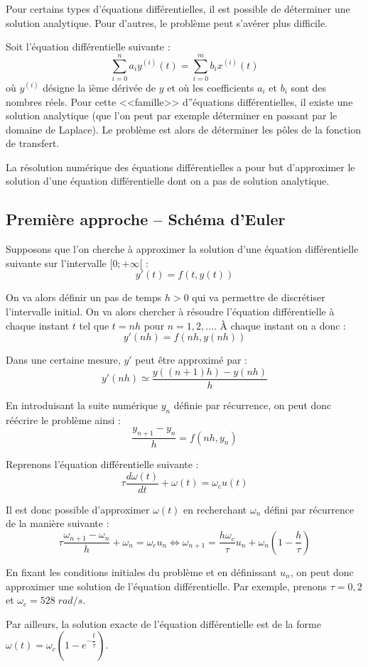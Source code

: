 \documentclass[10pt,fleqn]{article} %
\begin{document}
Pour certains types d'équations différentielles, il est possible de déterminer une solution analytique. Pour d'autres, le problème peut s'avérer plus difficile. 
\begin{exemple}
Soit l'équation différentielle suivante :
$$
\sum\limits_{i=0}^n a_i y^{(i)}(t) = \sum\limits_{i=0}^m b_i x^{(i)}(t)
$$
où $y^{(i)}$ désigne la ième dérivée de $y$ et où les coefficients $a_i$ et $b_i$ sont des nombres réels. Pour cette <<famille>> d''équations différentielles, il existe une solution analytique (que l'on peut par exemple déterminer en passant par le domaine de Laplace). Le problème est alors de déterminer les pôles de la fonction de transfert.
\end{exemple}

La résolution numérique des équations différentielles a pour but d'approximer le solution d'une équation différentielle dont on a pas de solution analytique.

\subsection{Première approche -- Schéma d'Euler}

Supposons que l'on cherche à approximer la solution d'une équation différentielle suivante sur l'intervalle $[0;+\infty[$ :
$$
y'(t)=f(t,y(t))
$$ 

On va alors définir un pas de temps $h>0$ qui va permettre de discrétiser l'intervalle initial. On va alors chercher à résoudre l'équation différentielle à chaque instant $t$ tel que $t=nh$ pour $n=1,2,...$. \`A chaque instant on a donc : 
$$
y'(nh)=f(nh,y(nh))
$$ 

Dans une certaine mesure, $y'$ peut être approximé par :
$$
y'(nh)\simeq \dfrac{y((n+1)h)-y(nh)}{h}
$$

En introduisant la suite numérique $y_n$ définie par récurrence, on peut donc réécrire le problème ainsi :
$$
\dfrac{y_{n+1}-y_n}{h} = f(nh,y_n)
$$

\begin{exemple}
Reprenons l'équation différentielle suivante :
$$
\tau \dfrac{d\omega(t)}{dt} + \omega(t)= \omega_c u(t)
$$

Il est donc possible d'approximer $\omega(t)$ en recherchant $\omega_n$ défini par récurrence de la manière suivante :
$$
\tau \dfrac{\omega_{n+1}-\omega_n}{h} + \omega_n=  \omega_c u_n \Longleftrightarrow 
\omega_{n+1} =  \dfrac{h \omega_c}{\tau} u_n +  \omega_n\left(1-\dfrac{h}{\tau}\right)
$$

En fixant les conditions initiales du problème et en définissant $u_n$, on peut donc approximer une solution de l'équation différentielle. 
Par exemple, prenons $\tau=0,2$ et $\omega_c=528 \; rad/s$.

Par ailleurs, la solution exacte de l'équation différentielle est de la forme $\omega(t)=\omega_c\left( 1-e^{-\dfrac{t}{\tau}}\right)$.

\end{exemple}
\end{document}
